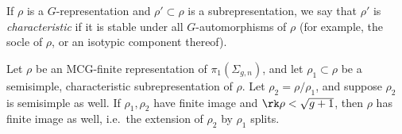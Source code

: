 If $\rho$ is a $G$-representation and $\rho'\subset \rho$ is a subrepresentation, we say that $\rho'$ is \emph{characteristic} if it is stable under all $G$-automorphisms of $\rho$ (for example, the socle of $\rho$, or an isotypic component thereof).
\begin{lemma}
\notready
	\label{lemma:semisimplicity}
Let $\rho$ be an MCG-finite representation of $\pi_1(\Sigma_{g,n})$, and let $\rho_1\subset\rho$ be a semisimple, characteristic subrepresentation of $\rho$. Let $\rho_2=\rho/\rho_1$, and suppose $\rho_2$ is semisimple as well. If $\rho_1, \rho_2$ have finite image and $\rk\rho<\sqrt{g+1}$, then $\rho$ has finite image as well, i.e.~the extension of $\rho_2$ by $\rho_1$ splits.
\end{lemma}
